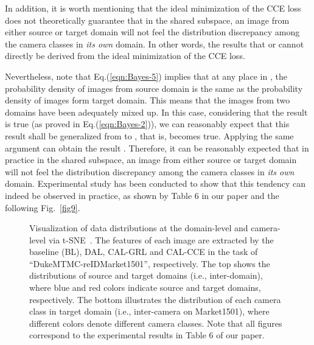 \documentclass[10pt,twocolumn,letterpaper]{article}
\begin{document}
In addition, it is worth mentioning that the ideal minimization of the CCE loss does not theoretically guarantee that in the shared subspace, an image from either source or target domain will not feel the distribution discrepancy among the camera classes in \textit{its own} domain. In other words, the results that  or  cannot directly be derived from the ideal minimization of the CCE loss. 

Nevertheless, note that Eq.(\ref{eqn:Bayes-5}) implies that at any place  in , the probability density of images from source domain is the same as the probability density of images form target domain. This means that the images from two domains have been adequately mixed up. In this case, considering that the result  is true (as proved in Eq.(\ref{eqn:Bayes-2})), we can reasonably expect that this result shall be generalized from  to , that is,  becomes true. Applying the same argument can obtain the result . Therefore, it can be reasonably expected that in practice in the shared subspace, an image from either source or target domain will not feel the distribution discrepancy among the camera classes in \textit{its own} domain. Experimental study has been conducted to show that this tendency can indeed be observed in practice, as shown by Table 6 in our paper and the following Fig.~\ref{fig9}.
 










\begin{figure*}[htb]
\renewcommand\thefigure{A1}
\centering
{}
\caption{Visualization of data distributions at the domain-level and camera-level via t-SNE~\cite{maaten2008visualizing}. The features of each image are extracted by the baseline (BL), DAL, CAL-GRL and CAL-CCE in the task of ``DukeMTMC-reIDMarket1501'', respectively.  The top shows the distributions of source and target domains (i.e., inter-domain), where blue and red colors indicate source and target domains, respectively. The bottom illustrates the distribution of each camera class in target domain (i.e., inter-camera on Market1501), where different colors denote different camera classes. Note that all figures correspond to the experimental results in Table 6 of our paper.}
\label{fig19}
\end{figure*}
\end{document}
